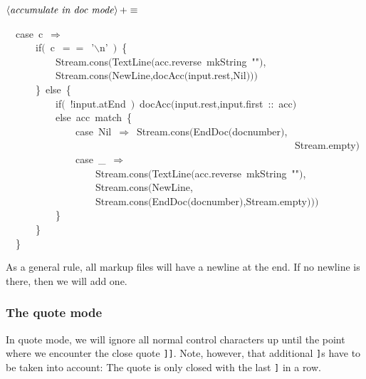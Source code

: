 \documentclass[a4paper,12pt]{article}
\begin{document}
$\left<\mbox{\emph{accumulate in doc mode}}\right>+\equiv$
\begin{program}~~{\vem case}~c~$\Rightarrow$
\\~~~~~~{\vem if}$($~c~$==$~'$\backslash$n'~$)$~{\small\{}
\\~~~~~~~~~~Stream.cons$($TextLine$($acc.reverse~mkString~""$)$,
\\~~~~~~~~~~Stream.cons$($NewLine,docAcc$($input.rest,Nil$)$$)$$)$
\\~~~~~~{\small\}}~{\vem else}~{\small\{}
\\~~~~~~~~~~{\vem if}$($~!input.atEnd~$)$~docAcc$($input.rest,input.first~{\rm :}{\rm :}~acc$)$
\\~~~~~~~~~~{\vem else}~acc~{\vem match}~{\small\{}
\\~~~~~~~~~~~~~~{\vem case}~Nil~$\Rightarrow$~Stream.cons$($EndDoc$($docnumber$)$,
\\~~~~~~~~~~~~~~~~~~~~~~~~~~~~~~~~~~~~~~~~~~~~~~~~~~~~~~~~~~Stream.empty$)$
\\~~~~~~~~~~~~~~{\vem case}~\_~$\Rightarrow$
\\~~~~~~~~~~~~~~~~~~Stream.cons$($TextLine$($acc.reverse~mkString~""$)$,
\\~~~~~~~~~~~~~~~~~~Stream.cons$($NewLine,
\\~~~~~~~~~~~~~~~~~~Stream.cons$($EndDoc$($docnumber$)$,Stream.empty$)$$)$$)$
\\~~~~~~~~~~{\small\}}
\\~~~~~~{\small\}}
\\~~{\small\}}
\\[0.5em]\end{program}
As a general rule, all markup files will have a newline at the end. If
no newline is there, then we will add one.

\subsubsection{The quote mode}
In quote mode, we will ignore all normal control characters up until the
point where we encounter the close quote \texttt{]]}. Note, however, that additional
\texttt{]}s have to be taken into account: The quote is only closed with the
last \texttt{]} in a row.
\end{document}
